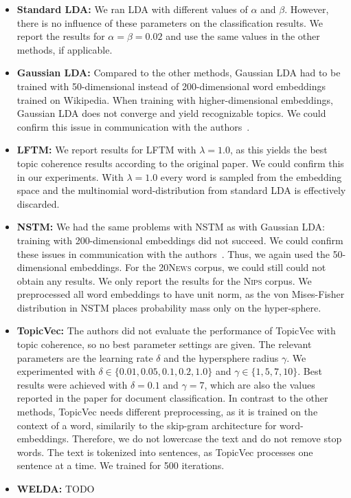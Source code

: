 \documentclass[
        a4paper,
        titlepage,
        twoside,
        parskip,
        numbers=noenddot
        ]{scrbook}
\theoremstyle{break}
\begin{document}
\begin{itemize}
  \item
    \textbf{Standard LDA:}
    We ran LDA with different values of $\alpha$ and $\beta$.
    However, there is no influence of these parameters on the classification results.
    We report the results for $\alpha = \beta = 0.02$ and use the same values in the other methods, if applicable.
  \item
    \textbf{Gaussian LDA:}
    Compared to the other methods, Gaussian LDA had to be trained with 50-dimensional instead of 200-dimensional word embeddings trained on Wikipedia.
    When training with higher-dimensional embeddings, Gaussian LDA does not converge and yield recognizable topics.
    We could confirm this issue in communication with the authors~\cite{Das2016}.
  \item
    \textbf{LFTM:}
    We report results for LFTM with $\lambda = 1.0$, as this yields the best topic coherence results according to the original paper.
    We could confirm this in our experiments.
    With $\lambda = 1.0$ every word is sampled from the embedding space and the multinomial word-distribution from standard LDA is effectively discarded.
  \item
    \textbf{NSTM:}
    We had the same problems with NSTM as with Gaussian LDA: training with 200-dimensional embeddings did not succeed.
    We could confirm these issues in communication with the authors~\cite{Saeedi2016}.
    Thus, we again used the 50-dimensional embeddings.
    For the \textsc{20News} corpus, we could still could not obtain any results.
    We only report the results for the \textsc{Nips} corpus.
    We preprocessed all word embeddings to have unit norm, as the von Mises-Fisher distribution in NSTM places probability mass only on the hyper-sphere.
  \item
    \textbf{TopicVec:}
    The authors did not evaluate the performance of TopicVec with topic coherence, so no best parameter settings are given.
    The relevant parameters are the learning rate $\delta$ and the hypersphere radius $\gamma$.
    We experimented with $\delta \in \{ 0.01, 0.05, 0.1, 0.2, 1.0 \}$ and $\gamma \in \{ 1, 5, 7, 10 \}$.
    Best results were achieved with $\delta = 0.1$ and $\gamma = 7$, which are also the values reported in the paper for document classification.
    In contrast to the other methods, TopicVec needs different preprocessing, as it is trained on the context of a word, similarily to the skip-gram architecture for word-embeddings.
    Therefore, we do not lowercase the text and do not remove stop words.
    The text is tokenized into sentences, as TopicVec processes one sentence at a time.
    We trained for 500 iterations.
  \item
    \textbf{WELDA:}
    TODO
\end{itemize}
\end{document}
